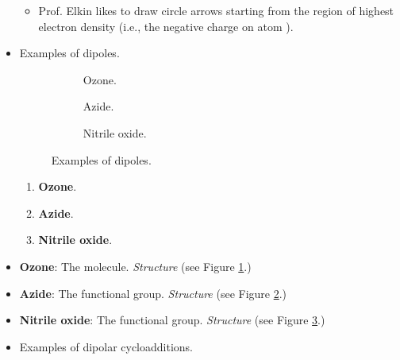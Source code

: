 \documentclass[../notes.tex]{subfiles}
\begin{document}
\begin{itemize}
    \begin{itemize}
        \item Prof. Elkin likes to draw circle arrows starting from the region of highest electron density (i.e., the negative charge on atom ).
    \end{itemize}
    \item Examples of dipoles.
    \begin{figure}[h!]
        \centering
        \footnotesize
        \begin{subfigure}[b]{0.2\linewidth}
            \centering
            \caption{Ozone.}
            \label{fig:dipoleExa}
        \end{subfigure}
        \begin{subfigure}[b]{0.2\linewidth}
            \centering
            \caption{Azide.}
            \label{fig:dipoleExb}
        \end{subfigure}
        \begin{subfigure}[b]{0.2\linewidth}
            \centering
            \caption{Nitrile oxide.}
            \label{fig:dipoleExc}
        \end{subfigure}
        \caption{Examples of dipoles.}
        \label{fig:dipoleEx}
    \end{figure}
    \begin{enumerate}
        \item \textbf{Ozone}.
        \item \textbf{Azide}.
        \item \textbf{Nitrile oxide}.
    \end{enumerate}
    \item \textbf{Ozone}: The  molecule. \emph{Structure} (see Figure \ref{fig:dipoleExa}.)
    \item \textbf{Azide}: The  functional group. \emph{Structure} (see Figure \ref{fig:dipoleExb}.)
    \item \textbf{Nitrile oxide}: The  functional group. \emph{Structure} (see Figure \ref{fig:dipoleExc}.)
    \item Examples of dipolar cycloadditions.
    \begin{figure}[H]
        \centering

\end{figure}
\end{itemize}
\end{document}
